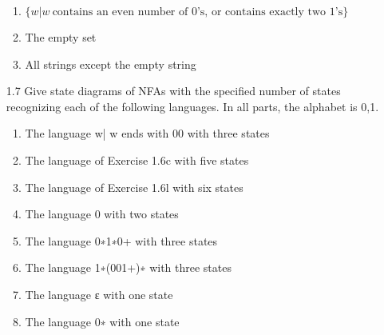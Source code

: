 \begin{enumerate}
\begin{enumerate}
              \item $\{w|w~ \text{contains an even number of }0\text{'s, or contains exactly two }1\text{'s}\}$
              \item The empty set
                    \begin{figure}[H]
                        \centering
                    \end{figure}
              \item All strings except the empty string
                    \begin{figure}[H]
                        \centering
                    \end{figure}
          \end{enumerate}
    \item[1.7]
          Give state diagrams of NFAs with the specified number of states recognizing each of the following languages. In all parts, the alphabet is {0,1}. 
          \begin{enumerate}
            \item The language {w| w ends with 00} with three states 
            \item The language of Exercise 1.6c with five states 
            \item The language of Exercise 1.6l with six states 
            \item The language {0} with two states 
            \item The language 0∗1∗0+ with three states 
            \item The language 1∗(001+)∗ with three states 
            \item The language {ε} with one state 
            \item The language 0∗ with one state
          \end{enumerate}

\end{enumerate}
